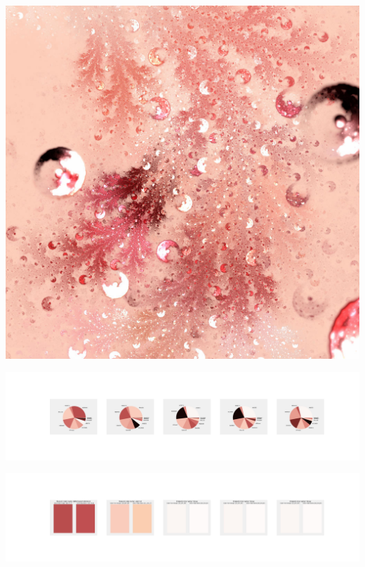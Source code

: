 \documentclass[11pt]{article}
\begin{document}
\begin{landscape}
    \begin{center}
    \includegraphics[width=\textwidth]{./nbimg/file (115).jpg}
    \end{center}

    \begin{center}
    \includegraphics[width=250mm]{./nbimg/pie-18.jpg}
    \end{center}

    \begin{center}
    \includegraphics[width=250mm]{./nbimg/peak-18.jpg}
    \end{center}
    


\end{landscape}
\end{document}
